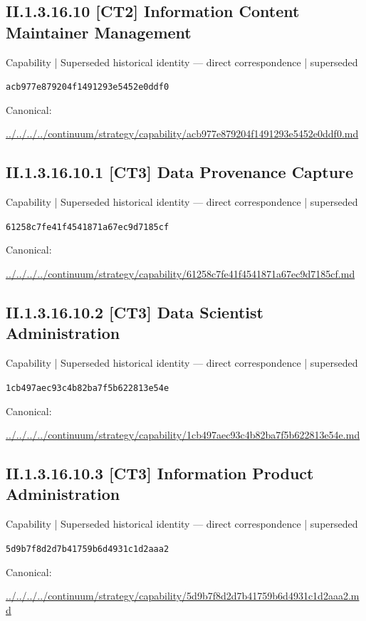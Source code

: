 \documentclass[10pt,a4paper]{article}
\begin{document}
\subsection*{II.1.3.16.10 [CT2] Information Content Maintainer Management}
{\small Capability | Superseded historical identity — direct correspondence | superseded}\par
\texttt{acb977e879204f1491293e5452e0ddf0}\par
Canonical: \par
{\footnotesize\url{../../../../continuum/strategy/capability/acb977e879204f1491293e5452e0ddf0.md}}\par
\subsection*{II.1.3.16.10.1 [CT3] Data Provenance Capture}
{\small Capability | Superseded historical identity — direct correspondence | superseded}\par
\texttt{61258c7fe41f4541871a67ec9d7185cf}\par
Canonical: \par
{\footnotesize\url{../../../../continuum/strategy/capability/61258c7fe41f4541871a67ec9d7185cf.md}}\par
\subsection*{II.1.3.16.10.2 [CT3] Data Scientist Administration}
{\small Capability | Superseded historical identity — direct correspondence | superseded}\par
\texttt{1cb497aec93c4b82ba7f5b622813e54e}\par
Canonical: \par
{\footnotesize\url{../../../../continuum/strategy/capability/1cb497aec93c4b82ba7f5b622813e54e.md}}\par
\subsection*{II.1.3.16.10.3 [CT3] Information Product Administration}
{\small Capability | Superseded historical identity — direct correspondence | superseded}\par
\texttt{5d9b7f8d2d7b41759b6d4931c1d2aaa2}\par
Canonical: \par
{\footnotesize\url{../../../../continuum/strategy/capability/5d9b7f8d2d7b41759b6d4931c1d2aaa2.md}}\par
\end{document}
